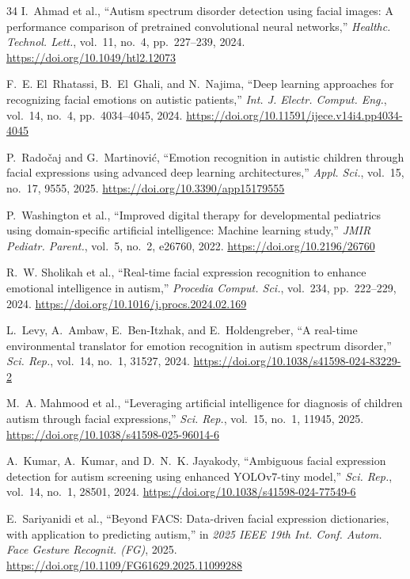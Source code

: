 \documentclass[3p,twocolumn,times]{elsarticle}
\begin{document}
\begin{thebibliography}{34}
		I.~Ahmad et al.,
		``Autism spectrum disorder detection using facial images: A performance
		comparison of pretrained convolutional neural networks,''
		\textit{Healthc. Technol. Lett.}, vol.~11, no.~4, pp.~227--239, 2024.
		\url{https://doi.org/10.1049/htl2.12073}
		
		F.~E. El~Rhatassi, B.~El~Ghali, and N.~Najima,
		``Deep learning approaches for recognizing facial emotions on autistic
		patients,''
		\textit{Int. J. Electr. Comput. Eng.}, vol.~14, no.~4, pp.~4034--4045, 2024.
		\url{https://doi.org/10.11591/ijece.v14i4.pp4034-4045}
		
		P.~Radočaj and G.~Martinović,
		``Emotion recognition in autistic children through facial expressions using
		advanced deep learning architectures,''
		\textit{Appl. Sci.}, vol.~15, no.~17, 9555, 2025.
		\url{https://doi.org/10.3390/app15179555}
		
		P.~Washington et al.,
		``Improved digital therapy for developmental pediatrics using domain-specific
		artificial intelligence: Machine learning study,''
		\textit{JMIR Pediatr. Parent.}, vol.~5, no.~2, e26760, 2022.
		\url{https://doi.org/10.2196/26760}
		
		R.~W. Sholikah et al.,
		``Real-time facial expression recognition to enhance emotional intelligence in
		autism,''
		\textit{Procedia Comput. Sci.}, vol.~234, pp.~222--229, 2024.
		\url{https://doi.org/10.1016/j.procs.2024.02.169}
		
		L.~Levy, A.~Ambaw, E.~Ben-Itzhak, and E.~Holdengreber,
		``A real-time environmental translator for emotion recognition in autism spectrum
		disorder,''
		\textit{Sci. Rep.}, vol.~14, no.~1, 31527, 2024.
		\url{https://doi.org/10.1038/s41598-024-83229-2}
		
		M.~A. Mahmood et al.,
		``Leveraging artificial intelligence for diagnosis of children autism through
		facial expressions,''
		\textit{Sci. Rep.}, vol.~15, no.~1, 11945, 2025.
		\url{https://doi.org/10.1038/s41598-025-96014-6}
		
		A.~Kumar, A.~Kumar, and D.~N.~K. Jayakody,
		``Ambiguous facial expression detection for autism screening using enhanced
		YOLOv7-tiny model,''
		\textit{Sci. Rep.}, vol.~14, no.~1, 28501, 2024.
		\url{https://doi.org/10.1038/s41598-024-77549-6}
		
		E.~Sariyanidi et al.,
		``Beyond FACS: Data-driven facial expression dictionaries, with application to
		predicting autism,''
		in \textit{2025 IEEE 19th Int. Conf. Autom. Face Gesture Recognit. (FG)}, 2025.
		\url{https://doi.org/10.1109/FG61629.2025.11099288}
		

\end{thebibliography}
\end{document}
